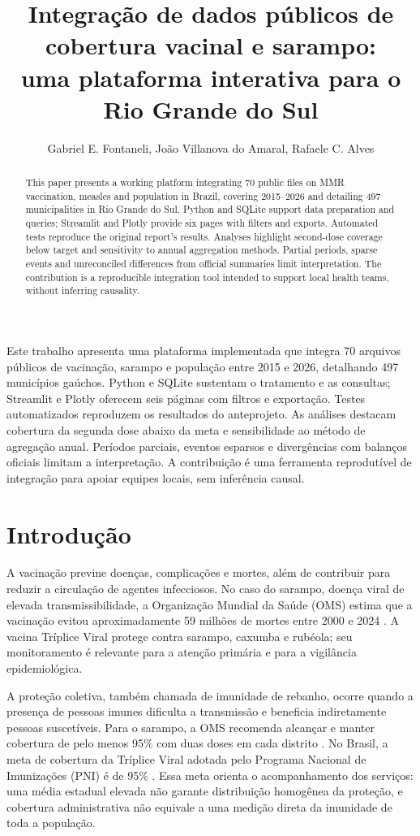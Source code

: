 \documentclass[12pt]{article}
\title{Integração de dados públicos de cobertura vacinal e sarampo:\\
uma plataforma interativa para o Rio Grande do Sul}
\author{Gabriel E. Fontaneli\inst{1}, João Villanova do Amaral\inst{1}, Rafaele C. Alves\inst{1}}
\begin{document}
\maketitle

\begin{abstract}
This paper presents a working platform integrating 70 public files on MMR vaccination, measles and population in Brazil, covering 2015--2026 and detailing 497 municipalities in Rio Grande do Sul. Python and SQLite support data preparation and queries; Streamlit and Plotly provide six pages with filters and exports. Automated tests reproduce the original report's results. Analyses highlight second-dose coverage below target and sensitivity to annual aggregation methods. Partial periods, sparse events and unreconciled differences from official summaries limit interpretation. The contribution is a reproducible integration tool intended to support local health teams, without inferring causality.
\end{abstract}

\begin{resumo}
Este trabalho apresenta uma plataforma implementada que integra 70 arquivos públicos de vacinação, sarampo e população entre 2015 e 2026, detalhando 497 municípios gaúchos. Python e SQLite sustentam o tratamento e as consultas; Streamlit e Plotly oferecem seis páginas com filtros e exportação. Testes automatizados reproduzem os resultados do anteprojeto. As análises destacam cobertura da segunda dose abaixo da meta e sensibilidade ao método de agregação anual. Períodos parciais, eventos esparsos e divergências com balanços oficiais limitam a interpretação. A contribuição é uma ferramenta reprodutível de integração para apoiar equipes locais, sem inferência causal.
\end{resumo}

\section{Introdução}
A vacinação previne doenças, complicações e mortes, além de contribuir para reduzir a circulação de agentes infecciosos. No caso do sarampo, doença viral de elevada transmissibilidade, a Organização Mundial da Saúde (OMS) estima que a vacinação evitou aproximadamente 59 milhões de mortes entre 2000 e 2024 \cite{oms2026}. A vacina Tríplice Viral protege contra sarampo, caxumba e rubéola; seu monitoramento é relevante para a atenção primária e para a vigilância epidemiológica.

A proteção coletiva, também chamada de imunidade de rebanho, ocorre quando a presença de pessoas imunes dificulta a transmissão e beneficia indiretamente pessoas suscetíveis. Para o sarampo, a OMS recomenda alcançar e manter cobertura de pelo menos 95\% com duas doses em cada distrito \cite{omssarampo}. No Brasil, a meta de cobertura da Tríplice Viral adotada pelo Programa Nacional de Imunizações (PNI) é de 95\% \cite{manual2024}. Essa meta orienta o acompanhamento dos serviços: uma média estadual elevada não garante distribuição homogênea da proteção, e cobertura administrativa não equivale a uma medição direta da imunidade de toda a população.
\end{document}
